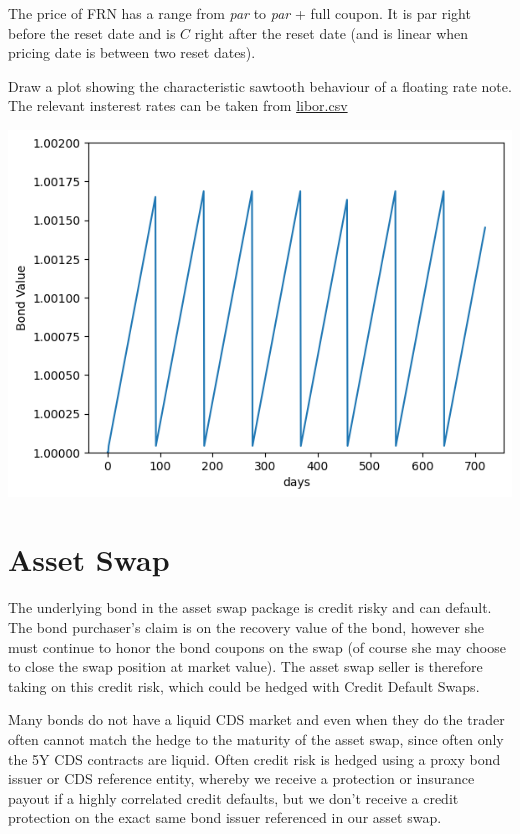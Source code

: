 \documentclass[12pt,a4paper]{article}
\begin{document}
The price of FRN has a range from \emph{par} to \emph{par} + full coupon. It is par right before the reset date and is $C$ right after the reset date (and is linear when pricing date is between two reset dates).

\begin{question}
	Draw a plot showing the characteristic sawtooth behaviour of a floating rate note. The relevant insterest rates can be taken from \href{https://raw.githubusercontent.com/matteosan1/advanced\_financial\_modeling/master/input_files/libor.csv}{libor.csv}
	
	\begin{center}
		\includegraphics[width=0.6\linewidth]{addons/floating_rate_note}
	\end{center}
\end{question}
\clearpage

\section{Asset Swap}

The underlying bond in the asset swap package is credit risky and can default. The bond purchaser’s claim is on the recovery value of the bond, however she must continue to honor the bond coupons on the swap (of course she may choose to close the swap position at market value). The asset swap seller is therefore taking on this credit risk, which could be hedged with Credit Default Swaps.

Many bonds do not have a liquid CDS market and even when they do the trader often cannot match the hedge to the maturity of the asset swap, since often only the 5Y CDS contracts are liquid. Often credit risk is hedged using a proxy bond issuer or CDS reference entity, whereby we receive a protection or insurance payout if a highly correlated credit defaults, but we don’t receive a credit protection on the exact same bond issuer referenced in our asset swap.
\end{document}
